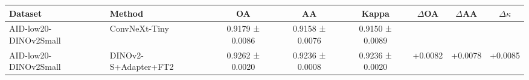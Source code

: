 \begin{tabular}{l l c c c c c c}
\toprule
Dataset & Method & OA & AA & Kappa & $\Delta$OA & $\Delta$AA & $\Delta\kappa$ \\
\midrule
AID-low20-DINOv2Small & ConvNeXt-Tiny & 0.9179 ± 0.0086 & 0.9158 ± 0.0076 & 0.9150 ± 0.0089 &  &  &  \\
AID-low20-DINOv2Small & DINOv2-S+Adapter+FT2 & 0.9262 ± 0.0020 & 0.9236 ± 0.0008 & 0.9236 ± 0.0020 & +0.0082 & +0.0078 & +0.0085 \\
\bottomrule
\end{tabular}
